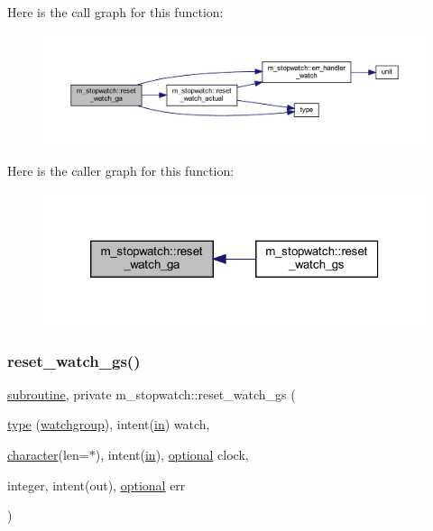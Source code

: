 Here is the call graph for this function\+:
\nopagebreak
\begin{figure}[H]
\begin{center}
\leavevmode
\includegraphics[width=350pt]{namespacem__stopwatch_aeeaefcdbbde78f813b93212704a46ce2_cgraph}
\end{center}
\end{figure}
Here is the caller graph for this function\+:
\nopagebreak
\begin{figure}[H]
\begin{center}
\leavevmode
\includegraphics[width=320pt]{namespacem__stopwatch_aeeaefcdbbde78f813b93212704a46ce2_icgraph}
\end{center}
\end{figure}
\mbox{\label{namespacem__stopwatch_a9044e009bd733b8a19724839001c496f}} 
\subsubsection{\texorpdfstring{reset\+\_\+watch\+\_\+gs()}{reset\_watch\_gs()}}
{\footnotesize\ttfamily \hyperlink{M__stopwatch_83_8txt_acfbcff50169d691ff02d4a123ed70482}{subroutine}, private m\+\_\+stopwatch\+::reset\+\_\+watch\+\_\+gs (\begin{DoxyParamCaption}\item[{\hyperlink{stop__watch_83_8txt_a70f0ead91c32e25323c03265aa302c1c}{type} (\hyperlink{structm__stopwatch_1_1watchgroup}{watchgroup}), intent(\hyperlink{M__journal_83_8txt_afce72651d1eed785a2132bee863b2f38}{in})}]{watch,  }\item[{\hyperlink{option__stopwatch_83_8txt_abd4b21fbbd175834027b5224bfe97e66}{character}(len=$\ast$), intent(\hyperlink{M__journal_83_8txt_afce72651d1eed785a2132bee863b2f38}{in}), \hyperlink{option__stopwatch_83_8txt_aa4ece75e7acf58a4843f70fe18c3ade5}{optional}}]{clock,  }\item[{integer, intent(out), \hyperlink{option__stopwatch_83_8txt_aa4ece75e7acf58a4843f70fe18c3ade5}{optional}}]{err }\end{DoxyParamCaption})\hspace{0.3cm}{\ttfamily [private]}}



